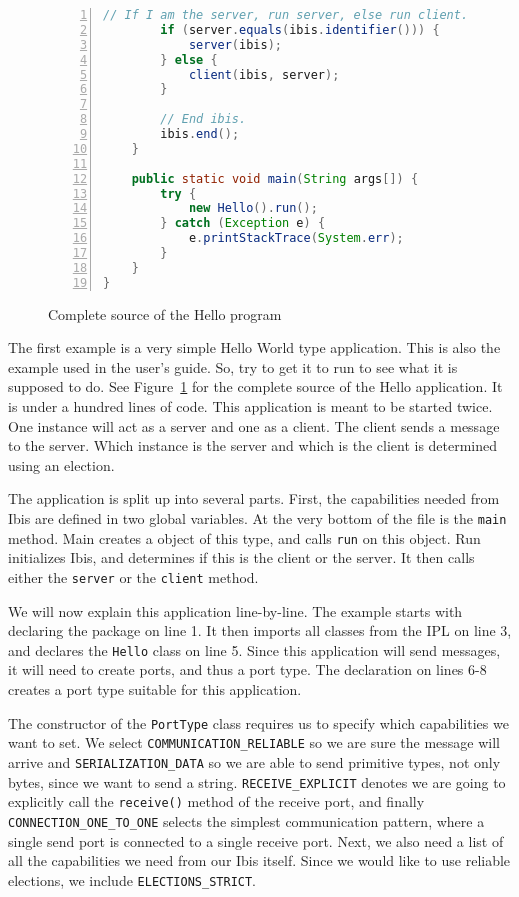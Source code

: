 \begin{figure}[p]
\begin{lstlisting}[language=Java,numbers=left, numbersep=3pt]
        // If I am the server, run server, else run client.
        if (server.equals(ibis.identifier())) {
            server(ibis);
        } else {
            client(ibis, server);
        }

        // End ibis.
        ibis.end();
    }

    public static void main(String args[]) {
        try {
            new Hello().run();
        } catch (Exception e) {
            e.printStackTrace(System.err);
        }
    }
}
\end{lstlisting}
\caption{Complete source of the Hello program}
\label{hello_source}
\end{figure}

The first example is a very simple Hello World type application. This is
also the example used in the user's guide. So, try to get it to run to
see what it is supposed to do. See Figure~\ref{hello_source} for the
complete source of the Hello application. It is under a hundred lines of
code. This application is meant to be started twice. One instance will
act as a server and one as a client. The client sends a message to the
server. Which instance is the server and which is the client is
determined using an election.

The application is split up into several parts. First, the capabilities
needed from Ibis are defined in two global variables. At the very bottom
of the file is the \texttt{main} method. Main creates a object of this
type, and calls \texttt{run} on this object. Run initializes Ibis, and
determines if this is the client or the server. It then calls either the
\texttt{server} or the \texttt{client} method.

We will now explain this application line-by-line. The example starts
with declaring the package on line 1. It then imports all classes from
the IPL on line 3, and declares the \texttt{Hello} class on line 5. Since
this application will send messages, it will need to create ports, and
thus a port type. The declaration on lines 6-8 creates a port type
suitable for this application. 

The constructor of the \texttt{PortType} class requires us to specify
which capabilities we want to set. We select
\texttt{COMMUNICATION\_RELIABLE} so we are sure the message will arrive
and \texttt{SERIALIZATION\_DATA} so we are able to send primitive types,
not only bytes, since we want to send a string. \texttt{RECEIVE\_EXPLICIT}
denotes we are going to explicitly call the \texttt{receive()} method of
the receive port, and finally \texttt{CONNECTION\_ONE\_TO\_ONE} selects
the simplest communication pattern, where a single send port is connected
to a single receive port.
Next, we also need a list of all the capabilities we need from our Ibis
itself. Since we would like to use reliable elections, we include
\texttt{ELECTIONS\_STRICT}.

